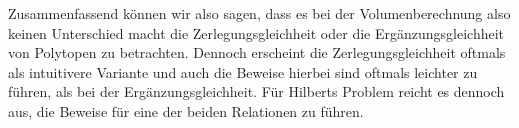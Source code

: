 \documentclass[11pt,titlepage]{article}
\theoremstyle{definition}
\newtheorem{definition}[theorem]{Definition}
\newtheorem{remark}[theorem]{Bemerkung}
\theoremstyle{remark}
\begin{document}
	Zusammenfassend können wir also sagen, dass es bei der Volumenberechnung 
	also keinen Unterschied macht die Zerlegungsgleichheit oder die 
	Ergänzungsgleichheit von Polytopen zu betrachten. Dennoch erscheint die 
	Zerlegungsgleichheit oftmals als intuitivere Variante und auch die Beweise 
	hierbei sind oftmals leichter zu führen, als bei der Ergänzungsgleichheit. 
	Für Hilberts Problem reicht es dennoch aus, die Beweise für eine 
	der beiden Relationen zu führen.

\end{document}

